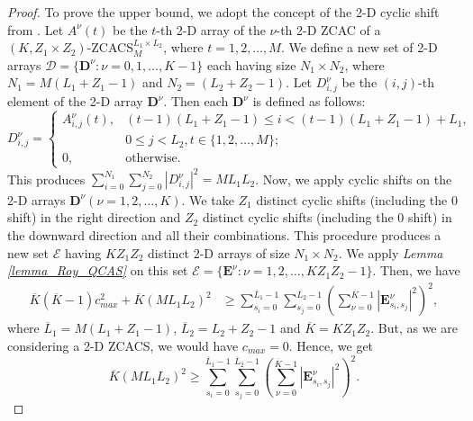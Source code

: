 \documentclass[pdflatex,sn-mathphys-num]{sn-jnl}%
\theoremstyle{thmstyleone}
\begin{document}
	\begin{proof}
		To prove the upper bound, we adopt the concept of the 2-D cyclic shift from \cite{Roy2024}. Let $A^\nu (t)$ be the $t$-th 2-D array of the $\nu$-th 2-D ZCAC of a $(K, Z_1 \times Z_2)$-ZCACS${}_{M}^{L_1 \times L_2}$, where $t=1,2, \dots, M$. 
		We define a new set of 2-D arrays $\mathcal{D}= \{ \mathbf{D}^\nu : \nu = 0,1, \dots, K-1\}$ each having size $N_1 \times N_2$, where $N_1 = M (L_1 +Z_1-1)$ and $N_2= (L_2 +Z_2-1)$. Let $D^\nu_{i,j}$ be the $(i,j)$-th element of the 2-D array $\mathbf{D}^\nu$. Then each $\mathbf{D}^\nu$ is defined as follows:
		\begin{equation}
			D^\nu_{i,j}=
			\begin{cases}
				A^\nu_{i,j}(t), & (t-1) (L_1+Z_1-1) \leq i < (t-1) (L_1+Z_1-1)+L_1, \\
				& 0 \leq j < L_2, t \in \{1,2, \dots, M\};\\
				0, & \text{otherwise}.
			\end{cases}
		\end{equation}
		This produces $\sum_{i=0}^{N_1} \sum_{j=0}^{N_2} \left| D^\nu_{i,j} \right|^2= ML_1L_2$. 
		Now, we apply cyclic shifts on the 2-D arrays $\mathbf{D}^\nu (\nu= 1,2, \dots, K)$. We take $Z_1$ distinct cyclic shifts (including the $0$ shift) in the right direction and $Z_2$ distinct cyclic shifts (including the $0$ shift) in the downward direction and all their combinations. This procedure produces a new set $\mathcal{E}$ having $K Z_1 Z_2$ distinct 2-D arrays of size $N_1 \times N_2$. We apply \textit{Lemma \ref{lemma_Roy_QCAS}} on this set  $\mathcal{E}= \{\mathbf{E}^\nu : \nu =1,2, \dots, K Z_1 Z_2-1\}$. Then, we have
		\begin{equation}
			\begin{split}
				\overline{K}(\overline{K} - 1) c^2_{max} + \overline{K} \left( M L_1 L_2\right)^2
				& \geq  \sum_{s_i=0}^{\overline{L}_1-1} \sum_{s_j=0}^{\overline{L}_2-1} \left( \sum_{\nu=0}^{\overline{K}-1}  \left| \mathbf{E}^{\nu}_{s_i,s_j} \right|^2 \right)^2,
			\end{split}
		\end{equation}
		where $\overline{L}_1= M (L_1 + Z_1 -1)$, $\overline{L}_2= L_2 + Z_2 -1$ and $\overline{K}= K Z_1 Z_2$. But, as we are considering a 2-D ZCACS, we would have $c_{max}=0$. Hence, we get 
		\begin{equation}\label{eqn_ZCACS_condition}
			\overline{K} \left( M L_1 L_2\right)^2 \geq \sum_{s_i=0}^{\overline{L}_1-1} \sum_{s_j=0}^{\overline{L}_2-1} \left( \sum_{\nu=0}^{\overline{K}-1}  \left| \mathbf{E}^{\nu}_{s_i,s_j} \right|^2 \right)^2.

\end{equation}
\end{proof}
\end{document}
